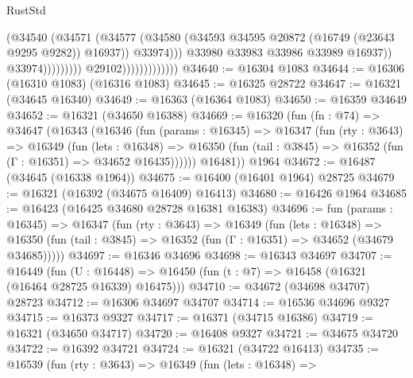 \begin{lexlean}{RustStd}
\begin{coremodule}
                                                    (@34540
                                                      (@34571
                                                        (@34577
                                                          (@34580
                                                            (@34593
                                                              @34595
                                                              @20872
                                                              (@16749 (@23643 @9295 @9282))
                                                              @16937))
                                                          @33974)))
                                                    @33980
                                                    @33983
                                                    @33986
                                                    @33989
                                                    @16937))
                                                @33974)))))))))
                              @29102)))))))))))))
@34640 := @16304 @1083
@34644 := @16306 (@16310 @1083) (@16316 @1083)
@34645 := @16325 @28722
@34647 := @16321 (@34645 @16340)
@34649 := @16363 (@16364 @1083)
@34650 := @16359 @34649
@34652 := @16321 (@34650 @16388)
@34669 := @16320
    (fun (fn : @74) =>
    @34647
      (@16343
        (@16346
          (fun (params : @16345) =>
          @16347
            (fun (rty : @3643) =>
            @16349
              (fun (lets : @16348) =>
              @16350 (fun (tail : @3845) => @16352 (fun (Γ : @16351) => @34652 @16435))))))
        @16481))
    @1964
@34672 := @16487 (@34645 (@16338 @1964))
@34675 := @16400 (@16401 @1964) @28725
@34679 := @16321 (@16392 (@34675 @16409) @16413)
@34680 := @16426 @1964
@34685 := @16423 (@16425 @34680 @28728 @16381 @16383)
@34696 := fun (params : @16345) =>
  @16347
    (fun (rty : @3643) =>
    @16349
      (fun (lets : @16348) =>
      @16350 (fun (tail : @3845) => @16352 (fun (Γ : @16351) => @34652 (@34679 @34685)))))
@34697 := @16346 @34696
@34698 := @16343 @34697
@34707 := @16449
    (fun (U : @16448) => @16450 (fun (t : @7) => @16458 (@16321 (@16464 @28725 @16339) @16475)))
@34710 := @34672 (@34698 @34707) @28723
@34712 := @16306 @34697 @34707
@34714 := @16536 @34696 @9327
@34715 := @16373 @9327
@34717 := @16371 (@34715 @16386)
@34719 := @16321 (@34650 @34717)
@34720 := @16408 @9327
@34721 := @34675 @34720
@34722 := @16392 @34721
@34724 := @16321 (@34722 @16413)
@34735 := @16539
    (fun (rty : @3643) =>
    @16349
      (fun (lets : @16348) =>

\end{coremodule}
\end{lexlean}
